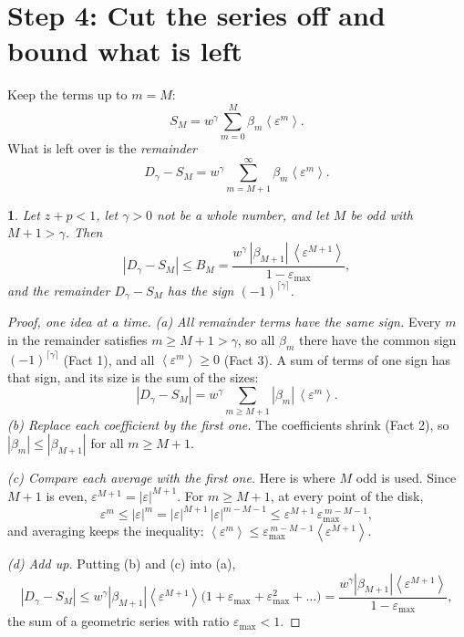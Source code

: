 \documentclass[11pt,a4paper]{article}
\newtheorem*{paperthm}{\paperthmname}
\newcommand{\paperthmname}{}
\theoremstyle{remark}
\newcommand{\avg}[1]{\left\langle #1 \right\rangle}
\begin{document}
\section{Step 4: Cut the series off and bound what is left}

Keep the terms up to $m=M$:
\[
  S_M=w^\gamma\sum_{m=0}^{M}\beta_m\avg{\varepsilon^m}.
\]
What is left over is the \emph{remainder}
\[
  D_\gamma-S_M=w^\gamma\sum_{m=M+1}^\infty\beta_m\avg{\varepsilon^m}.
\]

\renewcommand{\paperthmname}{Theorem 2 (as in the paper)}
\begin{paperthm}
Let $z+p<1$, let $\gamma>0$ not be a whole number, and let $M$ be odd with $M+1>\gamma$. Then
\begin{equation}
  |D_\gamma-S_M|\le B_M=\frac{w^\gamma\,|\beta_{M+1}|\,\avg{\varepsilon^{M+1}}}{1-\varepsilon_{\max}},
  \label{eq:bound}
\end{equation}
and the remainder $D_\gamma-S_M$ has the sign $(-1)^{\lceil\gamma\rceil}$.
\end{paperthm}

\begin{proof}[Proof, one idea at a time]
\emph{(a) All remainder terms have the same sign.} Every $m$ in the remainder satisfies
$m\ge M+1>\gamma$, so all $\beta_m$ there have the common sign $(-1)^{\lceil\gamma\rceil}$
(Fact 1), and all $\avg{\varepsilon^m}\ge0$ (Fact 3). A sum of terms of one sign has that sign,
and its size is the sum of the sizes:
\[
  |D_\gamma-S_M|=w^\gamma\sum_{m\ge M+1}|\beta_m|\,\avg{\varepsilon^m}.
\]
\emph{(b) Replace each coefficient by the first one.} The coefficients shrink (Fact 2), so
$|\beta_m|\le|\beta_{M+1}|$ for all $m\ge M+1$.

\emph{(c) Compare each average with the first one.} Here is where $M$ odd is used. Since $M+1$
is even, $\varepsilon^{M+1}=|\varepsilon|^{M+1}$. For $m\ge M+1$, at every point of the disk,
\[
  \varepsilon^m\le|\varepsilon|^m=|\varepsilon|^{M+1}\,|\varepsilon|^{m-M-1}
  \le\varepsilon^{M+1}\,\varepsilon_{\max}^{\,m-M-1},
\]
and averaging keeps the inequality:
$\avg{\varepsilon^m}\le\varepsilon_{\max}^{\,m-M-1}\avg{\varepsilon^{M+1}}$.

\emph{(d) Add up.} Putting (b) and (c) into (a),
\[
  |D_\gamma-S_M|\le w^\gamma|\beta_{M+1}|\avg{\varepsilon^{M+1}}
  \bigl(1+\varepsilon_{\max}+\varepsilon_{\max}^2+\dots\bigr)
  =\frac{w^\gamma|\beta_{M+1}|\avg{\varepsilon^{M+1}}}{1-\varepsilon_{\max}},
\]
the sum of a geometric series with ratio $\varepsilon_{\max}<1$.
\end{proof}
\end{document}
